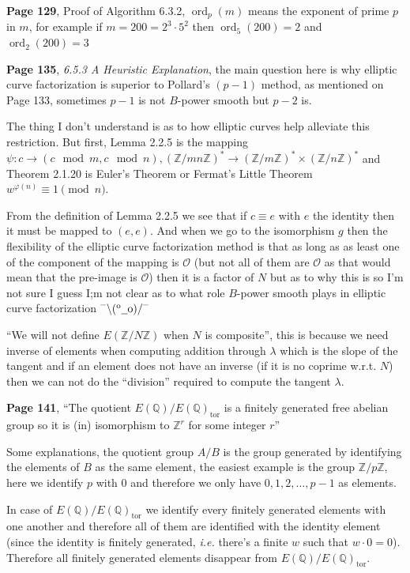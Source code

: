 \documentclass[aps,preprint,preprintnumbers,nofootinbib,showpacs,prd]{revtex4-1}
\newcommand{\ie}{{\it i.e.} }
\newcommand{\dunno}{$ {}^{\mbox {--}}\backslash(^{\rm o}{}\underline{\hspace{0.2cm}}{\rm o})/^{\mbox {--}}$}
\DeclareMathOperator{\ord}{ord}
\DeclareMathOperator{\tor}{tor}
\begin{document}
{\bf Page 129}, Proof of Algorithm 6.3.2, $\ord_p(m)$ means the exponent of prime $p$ in $m$, for example if $m = 200 = 2^3 \cdot 5^2$ then $\ord_5(200) = 2$ and $\ord_2(200) = 3$

{\bf Page 135}, {\it 6.5.3 A Heuristic Explanation}, the main question here is why elliptic curve factorization is superior to Pollard's $(p-1)$ method, as mentioned on Page 133, sometimes $p-1$ is not $B$-power smooth but $p-2$ is.

The thing I don't understand is as to how elliptic curves help alleviate this restriction. But first, Lemma 2.2.5 is the mapping $\psi: c \to (c \mod m, c \mod n), (\mathbb{Z}/mn\mathbb{Z})^* \to (\mathbb{Z}/m\mathbb{Z})^* \times (\mathbb{Z}/n\mathbb{Z})^*$ and Theorem 2.1.20 is Euler's Theorem or Fermat's Little Theorem $w^{\varphi(n)} \equiv 1 \pmod{n}$.

From the definition of Lemma 2.2.5 we see that if $c \equiv e$ with $e$ the identity then it must be mapped to $(e, e)$. And when we go to the isomorphism $g$ then the flexibility of the elliptic curve factorization method is that as long as as least one of the component of the mapping is $\mathcal{O}$ (but not all of them are $\mathcal{O}$ as that would mean that the pre-image is $\mathcal{O}$) then it is a factor of $N$ but as to why this is so I'm not sure I guess I;m not clear as to what role $B$-power smooth plays in elliptic curve factorization \dunno

``We will not define $E(\mathbb{Z}/N\mathbb{Z})$ when $N$ is composite'', this is because we need inverse of elements when computing addition through $\lambda$ which is the slope of the tangent and if an element does not have an inverse (if it is no coprime w.r.t. $N$) then we can not do the ``division'' required to compute the tangent $\lambda$.

{\bf Page 141}, ``The quotient $E(\mathbb{Q})/E(\mathbb{Q})_{\tor}$ is a finitely generated free abelian group so it is (in) isomorphism to $\mathbb{Z}^r$ for some integer $r$''

Some explanations, the quotient group $A/B$ is the group generated by identifying the elements of $B$ as the same element, the easiest example is the group $\mathbb{Z}/p\mathbb{Z}$, here we identify $p$ with $0$ and therefore we only have $0, 1, 2, \ldots, p-1$ as elements.

In case of $E(\mathbb{Q})/E(\mathbb{Q})_{\tor}$ we identify every finitely generated elements with one another and therefore all of them are identified with the identity element (since the identity is finitely generated, \ie there's a finite $w$ such that $w\cdot 0 = 0$). Therefore all finitely generated elements disappear from $E(\mathbb{Q})/E(\mathbb{Q})_{\tor}$.
\end{document}
